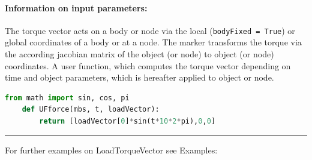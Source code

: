 \paragraph{Information on input parameters:} 
\finishTable
 \noindent
    The torque vector acts on a body or node via the local (\texttt{bodyFixed = True}) or global coordinates of a body or at a node. 
    The marker transforms the torque via the according jacobian matrix of the object (or node) to object (or node) coordinates.
    A user function, which computes the torque vector depending on time and object parameters, which is hereafter applied to object or node.
    \finishTable
    \userFunctionExample{}
    \pythonstyle
    \begin{lstlisting}[language=Python]
    from math import sin, cos, pi
    def UFforce(mbs, t, loadVector): 
        return [loadVector[0]*sin(t*10*2*pi),0,0]
    \end{lstlisting}
\vspace{6pt}\par\noindent\rule{\textwidth}{0.4pt}
%
\noindent For further examples on LoadTorqueVector see Examples:
\bi
